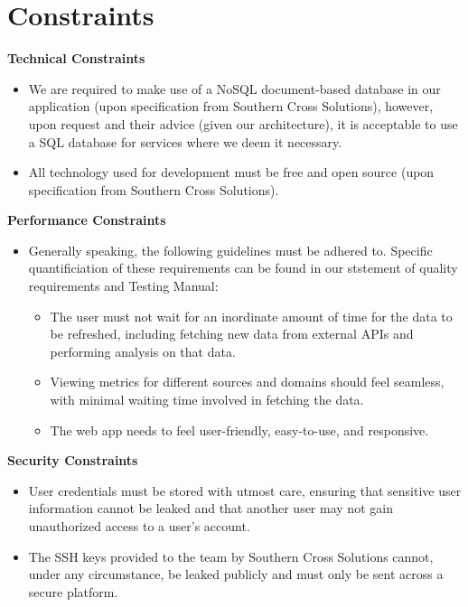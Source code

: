 \documentclass[12pt]{article}
\begin{document}
\newpage

\section{Constraints}

\textbf{Technical Constraints}
\begin{itemize}
  \item We are required to make use of a NoSQL document-based database in our application (upon specification from Southern Cross Solutions), however, upon request and their advice (given our architecture), it is acceptable to use a SQL database for services where we deem it necessary.
  \item All technology used for development must be free and open source (upon specification from Southern Cross Solutions).
\end{itemize}

\textbf{Performance Constraints}
\begin{itemize}
  \item Generally speaking, the following guidelines must be adhered to. Specific quantificiation of these requirements can be found in our ststement of quality requirements and Testing Manual:
        \begin{itemize}
          \item The user must not wait for an inordinate amount of time for the data to be refreshed, including fetching new data from external APIs and performing analysis on that data.
          \item Viewing metrics for different sources and domains should feel seamless, with minimal waiting time involved in fetching the data.
          \item The web app needs to feel user-friendly, easy-to-use, and responsive.
        \end{itemize}
\end{itemize}

\textbf{Security Constraints}
\begin{itemize}
  \item User credentials must be stored with utmost care, ensuring that sensitive user information cannot be leaked and that another user may not gain unauthorized access to a user's account.
  \item The SSH keys provided to the team by Southern Cross Solutions cannot, under any circumstance, be leaked publicly and must only be sent across a secure platform.
\end{itemize}
\end{document}
